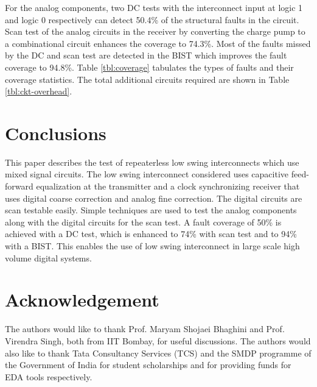 \documentclass[conference]{IEEEtran}
\begin{document}
For the analog components, two DC tests with the interconnect input at logic 1 and
logic 0 respectively can detect 50.4\% of the structural faults in the circuit.
Scan test of the analog circuits in the receiver by converting the charge pump
to a combinational circuit enhances the coverage to 74.3\%. Most of the faults 
missed by the DC and scan test are detected in the BIST which improves
the fault coverage to 94.8\%. Table \ref{tbl:coverage} tabulates the types 
of faults and their coverage statistics. The total additional circuits required are shown in Table \ref{tbl:ckt-overhead}.


\section{Conclusions}
This paper describes the test of repeaterless low swing interconnects which
use mixed signal circuits. The low swing interconnect considered uses
capacitive feed-forward equalization at the transmitter and 
a clock synchronizing  receiver that uses digital coarse correction 
and analog fine correction. The digital circuits are scan testable easily.
Simple techniques are used to test the analog 
components along with the digital circuits for the scan test. 
A fault coverage of 50\% is achieved with a DC test, which is 
enhanced to 74\% with scan test and to 94\% with a BIST.
This enables the use of low swing interconnect
in large scale high volume digital systems.


\section*{Acknowledgement}
The authors would like to thank Prof. Maryam Shojaei Bhaghini and
Prof. Virendra Singh, both from IIT Bombay, for useful discussions. 
The authors would also like to thank Tata Consultancy Services (TCS)
and the SMDP programme of the Government of India for student scholarships
and for providing funds for EDA tools respectively.



\end{document}
